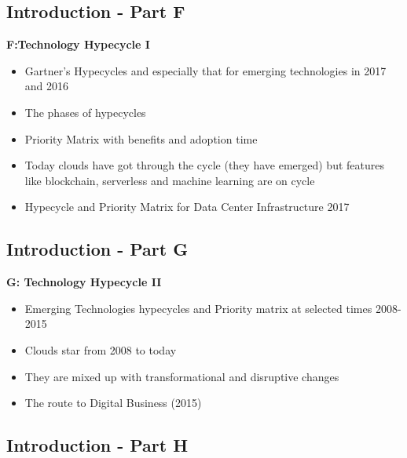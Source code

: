 \subsection{Introduction - Part F}\label{s:cloud-fundamentals-f}

\textbf{F:Technology Hypecycle I}

\begin{itemize}
\item Gartner's Hypecycles and especially that for emerging
  technologies in 2017 and 2016
\item The phases of hypecycles
\item Priority Matrix with benefits and adoption time
\item Today clouds have got through the cycle (they have emerged) but
  features like blockchain, serverless and machine learning are on
  cycle
\item Hypecycle and Priority Matrix for Data Center Infrastructure
  2017

\end{itemize}

\subsection{Introduction - Part G}\label{s:cloud-fundamentals-g}

\textbf{G: Technology Hypecycle II}

\begin{itemize}
\item Emerging Technologies hypecycles and Priority matrix at selected
  times 2008-2015
\item Clouds star from 2008 to today
\item They are mixed up with transformational and disruptive changes
\item The route to Digital Business (2015)
\end{itemize}

\subsection{Introduction - Part H}\label{s:cloud-fundamentals-h}

